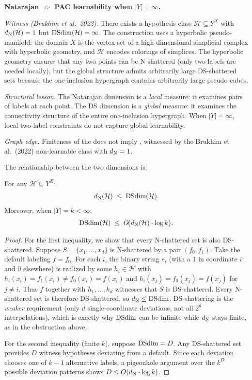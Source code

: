 \begin{obstbox}
\textbf{Natarajan $\not\Rightarrow$ PAC learnability when $|Y| = \infty$.}

\medskip\noindent
\emph{Witness (Brukhim et al.~2022).}
There exists a hypothesis class $\mathcal{H} \subseteq Y^X$ with
$d_{\mathrm{N}}(\mathcal{H}) = 1$ but $\mathrm{DSdim}(\mathcal{H}) = \infty$.  The
construction uses a hyperbolic pseudo-manifold: the domain $X$ is the
vertex set of a high-dimensional simplicial complex with hyperbolic
geometry, and $\mathcal{H}$ encodes colorings of simplices.  The
hyperbolic geometry ensures that any two points can be N-shattered
(only two labels are needed locally), but the global structure admits
arbitrarily large DS-shattered sets because the one-inclusion hypergraph
contains arbitrarily large pseudo-cubes.

\medskip\noindent
\emph{Structural lesson.}
The Natarajan dimension is a \emph{local} measure: it examines pairs of
labels at each point.  The DS dimension is a \emph{global} measure: it
examines the connectivity structure of the entire one-inclusion hypergraph.
When $|Y| = \infty$, local two-label constraints do not capture global
learnability.

\medskip\noindent
\emph{Graph edge.}  Finiteness of the  does not imply
, witnessed by the Brukhim et al.\ (2022) non-learnable class
with $d_{\mathrm{N}} = 1$.
\end{obstbox}


The relationship between the two dimensions is:

\begin{prop}[DS vs.\ Natarajan]
\label{prop:ds-vs-nat}
For any $\mathcal{H} \subseteq Y^X$:
\[
  d_{\mathrm{N}}(\mathcal{H}) \;\leq\; \mathrm{DSdim}(\mathcal{H}).
\]
Moreover, when $|Y| = k < \infty$:
\[
  \mathrm{DSdim}(\mathcal{H}) \;\leq\; O\!\bigl(d_{\mathrm{N}}(\mathcal{H}) \cdot \log k\bigr).
\]
\end{prop}

\begin{proof}
For the first inequality, we show that every N-shattered set is also
DS-shattered.  Suppose $S = \{x_1, \ldots, x_d\}$ is N-shattered by a pair
$(f_0, f_1)$.  Take the default labeling $f = f_0$.  For each $i$, the binary
string $e_i$ (with a $1$ in coordinate $i$ and $0$ elsewhere) is realized by
some $h_i \in \mathcal{H}$ with $h_i(x_i) = f_1(x_i) \neq f_0(x_i) = f(x_i)$
and $h_i(x_j) = f_0(x_j) = f(x_j)$ for $j \neq i$.  Thus $f$ together with
$h_1, \ldots, h_d$ witnesses that $S$ is DS-shattered.  Every N-shattered set
is therefore DS-shattered, so $d_{\mathrm{N}} \leq \mathrm{DSdim}$.  DS-shattering is the
\emph{weaker} requirement (only $d$ single-coordinate deviations, not all
$2^d$ interpolations), which is exactly why $\mathrm{DSdim}$ can be infinite while
$d_{\mathrm{N}}$ stays finite, as in the obstruction above.

For the second inequality (finite $k$), suppose $\mathrm{DSdim} = D$.  Any
DS-shattered set provides $D$ witness hypotheses deviating from a default.
Since each deviation chooses one of $k-1$ alternative labels, a pigeonhole
argument over the $k^D$ possible deviation patterns shows
$D \leq O(d_{\mathrm{N}} \cdot \log k)$.
\end{proof}


